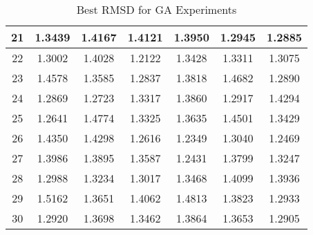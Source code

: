 \begin{table}
\begin{tabular}{ | c | c | c | c | c | c | c | }
		21 & 1.3439 & 1.4167 & 1.4121 & 1.3950 & 1.2945 & 1.2885 \\ \hline
		22 & 1.3002 & 1.4028 & 1.2122 & 1.3428 & 1.3311 & 1.3075 \\ \hline
		23 & 1.4578 & 1.3585 & 1.2837 & 1.3818 & 1.4682 & 1.2890 \\ \hline
		24 & 1.2869 & 1.2723 & 1.3317 & 1.3860 & 1.2917 & 1.4294 \\ \hline
		25 & 1.2641 & 1.4774 & 1.3325 & 1.3635 & 1.4501 & 1.3429 \\ \hline
		26 & 1.4350 & 1.4298 & 1.2616 & 1.2349 & 1.3040 & 1.2469 \\ \hline
		27 & 1.3986 & 1.3895 & 1.3587 & 1.2431 & 1.3799 & 1.3247 \\ \hline
		28 & 1.2988 & 1.3234 & 1.3017 & 1.3468 & 1.4099 & 1.3936 \\ \hline
		29 & 1.5162 & 1.3651 & 1.4062 & 1.4813 & 1.3823 & 1.2933 \\ \hline
		30 & 1.2920 & 1.3698 & 1.3462 & 1.3864 & 1.3653 & 1.2905 \\ \hline
	\end{tabular}
	\caption{Best RMSD for GA Experiments}
	\label{table:appendix-ga}
\end{table}


